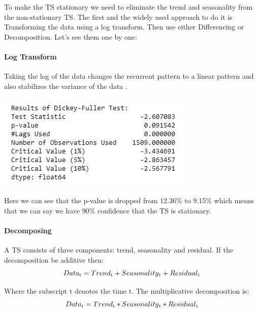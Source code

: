 		To make the TS stationary we need to eliminate the trend and seasonality from the non-stationary TS. The first and the widely used approach to do it is Transforming the data using a log transform. Then use either Differencing or Decomposition. Let’s see them one by one:

		\paragraph{Log Transform}
			Taking the log of the data changes the recurrent pattern to a linear pattern and also stabilizes the variance of the data \cite{18}.

		\begin{center}
		\includegraphics[width=\linewidth]{figures/DF-Test-Results-for-log-transformed-Closing-price.jpg}	
		\label{fig: DF Test Results for log-transformed Closing Price}
		\end{center}

			Here we can see that the p-value is dropped from 12.36\% to 9.15\% which means that we can say we have 90\% confidence that the TS is stationary.

		\paragraph{Decomposing}

			A TS consists of three components: trend, seasonality and residual. If the decomposition be additive then:
				\begin{equation}
					Data\textsubscript{t} = Trend\textsubscript{t} + Seasonality\textsubscript{t} + Residual\textsubscript{t}  
				\end{equation}
				


			Where the subscript t denotes the time t.
			The multiplicative decomposition is:
				\begin{equation}
					Data\textsubscript{t} = Trend\textsubscript{t} * Seasonality\textsubscript{t} * Residual\textsubscript{t} 
				\end{equation}
				

